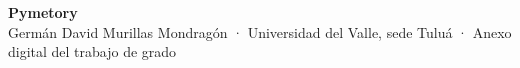 \documentclass[letterpaper, 11pt, oneside]{book}
\begin{document}
\pagestyle{plain}
\begin{center}
{\LARGE\bfseries Pymetory}\\[4pt]
Germán David Murillas Mondragón · Universidad del Valle, sede Tuluá · Anexo digital del trabajo de grado
\end{center}

\end{document}
